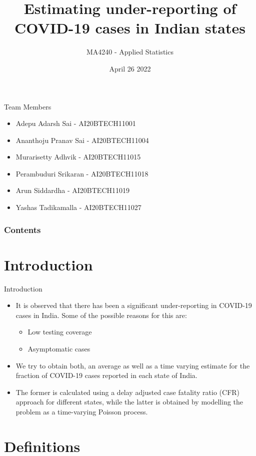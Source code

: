 \documentclass[10pt]{beamer}
\title{Estimating under-reporting of
COVID-19 cases in Indian states}
\author[MA4240 - Applied Statistics]{MA4240 - Applied Statistics}
\institute{IIT Hyderabad}
\date{April 26 2022}
\begin{document}
\frame{\titlepage}
\begin{frame}{Team Members}
    \begin{itemize}
        \item Adepu Adarsh Sai - AI20BTECH11001
        \item Ananthoju Pranav Sai - AI20BTECH11004
        \item Murarisetty Adhvik - AI20BTECH11015
        \item Perambuduri Srikaran - AI20BTECH11018
        \item Arun Siddardha - AI20BTECH11019
        \item Yashas Tadikamalla - AI20BTECH11027
    \end{itemize}
\end{frame}
\begin{frame}
\frametitle{Contents}
\tableofcontents
\end{frame}
\section{Introduction}
\begin{frame}{Introduction}
\begin{itemize}
    \item It is observed that there has been a significant under-reporting in COVID-19 cases in India. Some of the possible reasons for this are:
\begin{itemize}
    \item Low testing coverage
    \item Asymptomatic cases
\end{itemize}
    \item We try to obtain both, an average as well as a time varying estimate for the fraction of COVID-19 cases reported in each state of India.
    \item The former is calculated using a delay adjusted case fatality ratio (CFR) approach for different states, while the latter is obtained by modelling the problem as a time-varying Poisson process.
\end{itemize}
\end{frame} 
\section{Definitions}
\end{document}
